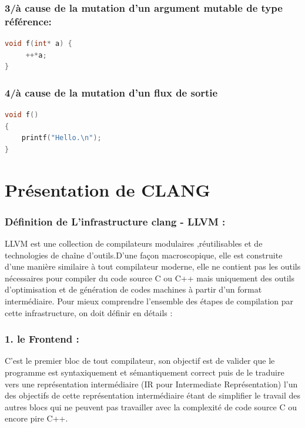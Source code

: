 \documentclass[12pt,titlepage]{article}
\begin{document}
\subsubsection{3/à cause de la mutation d'un argument mutable de type référence:}

\begin{lstlisting}[language=c]
void f(int* a) {
     ++*a;
}
\end{lstlisting}

\subsubsection {4/à cause de la mutation d'un flux de sortie}

\begin{lstlisting}[language=c]
void f()
{
    printf("Hello.\n");
}
\end{lstlisting}

\section{Présentation de CLANG} 


\subsubsection{ Définition de  L’infrastructure clang - LLVM :}
LLVM est une collection de compilateurs modulaires ,réutilisables et de technologies de chaîne d'outils.D’une façon macroscopique, elle est construite d’une manière similaire à tout compilateur moderne, elle ne contient pas les outils nécessaires pour compiler du code source C ou C++ mais uniquement des outils d’optimisation et de génération de codes machines à partir d’un format intermédiaire. 
 Pour mieux comprendre l’ensemble des étapes de compilation par cette infrastructure,   on doit définir en détails :
       
     \subsubsection{ 1. le Frontend : }
     C'est le premier bloc de tout compilateur, son objectif est de valider que le programme est syntaxiquement et sémantiquement correct puis de le traduire vers une représentation intermédiaire (IR pour Intermediate Représentation) l'un des objectifs de cette représentation intermédiaire étant de simplifier le travail des autres blocs qui ne peuvent pas travailler avec la complexité de code source C ou encore pire C++. 
\end{document}
